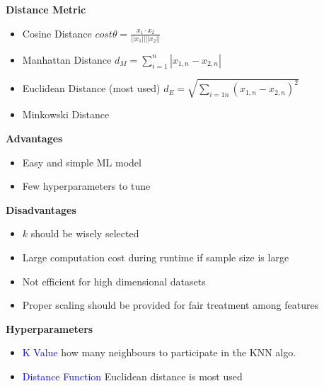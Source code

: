 \textbf{Distance Metric}
\begin{itemize}
    \item Cosine Distance $cost \theta = \frac{x_1 \cdot x_2}{||x_1|| ||x_2||}$
    \item Manhattan Distance $d_M = \sum_{i=1}^{n}| x_{1,n} - x_{2,n} |$
    \item Euclidean Distance (most used) $d_E = \sqrt{\sum_{i=1n}^{}(x_{1,n} - x_{2,n})^2}$
    \item Minkowski Distance
\end{itemize}
\textbf{Advantages}
\begin{itemize}
    \item Easy and simple ML model
    \item Few hyperparameters to tune
\end{itemize}

\textbf{Disadvantages}
\begin{itemize}
    \item $k$ should be wisely selected
    \item Large computation cost during runtime if sample size is large
    \item Not efficient for high dimensional datasets
    \item Proper scaling should be provided for fair treatment among features
\end{itemize}

\textbf{Hyperparameters}
\begin{itemize}
    \item \textcolor{blue}{K Value} how many neighbours to participate in the KNN algo.
    \item \textcolor{blue}{Distance Function} Euclidean distance is most used
\end{itemize}
